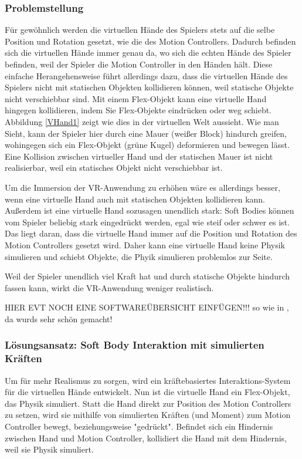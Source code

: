\subsubsection{Problemstellung}
Für gewöhnlich werden die virtuellen Hände des Spielers stets auf die selbe Position und Rotation gesetzt, wie die des Motion Controllers. Dadurch befinden sich die virtuellen Hände immer genau da, wo sich die echten Hände des Spieler befinden, weil der Spieler die Motion Controller in den Händen hält.
Diese einfache Herangehensweise führt allerdings dazu, dass die virtuellen Hände des Spielers nicht mit statischen Objekten kollidieren können, weil statische Objekte nicht verschiebbar sind. Mit einem Flex-Objekt kann eine virtuelle Hand hingegen kollidieren, indem Sie Flex-Objekte eindrücken oder weg schiebt. Abbildung \ref{VHand1} zeigt wie dies in der virtuellen Welt aussieht. Wie man Sieht, kann der Spieler hier durch eine Mauer (weißer Block) hindurch greifen, wohingegen sich ein Flex-Objekt (grüne Kugel) deformieren und bewegen lässt. Eine Kollision zwischen virtueller Hand und der statischen Mauer ist nicht realisierbar, weil ein statisches Objekt nicht verschiebbar ist.


Um die Immersion der VR-Anwendung zu erhöhen wäre es allerdings besser, wenn eine virtuelle Hand auch mit statischen Objekten kollidieren kann. Außerdem ist eine virtuelle Hand sozusagen unendlich stark: Soft Bodies können vom Spieler beliebig stark eingedrückt werden, egal wie steif oder schwer es ist. Das liegt daran, dass die virtuelle Hand immer auf die Position und Rotation des Motion Controllers gesetzt wird. Daher kann eine virtuelle Hand keine Physik simulieren und schiebt Objekte, die Phyik simulieren problemlos zur Seite.

Weil der Spieler unendlich viel Kraft hat und durch statische Objekte hindurch fassen kann, wirkt die VR-Anwendung weniger realistisch.

HIER EVT NOCH EINE SOFTWAREÜBERSICHT EINFÜGEN!!! so wie in \cite{VRSim20}, da wurds sehr schön gemacht!

\subsubsection{Lösungsansatz: Soft Body Interaktion mit simulierten Kräften}
Um für mehr Realismus zu sorgen, wird ein kräftebasiertes Interaktions-System für die virtuellen Hände entwickelt. Nun ist die virtuelle Hand ein Flex-Objekt, das Physik simuliert. Statt die Hand direkt zur Position des Motion Controllers zu setzen, wird sie mithilfe von simulierten Kräften (und Moment) zum Motion Controller bewegt, beziehungsweise "gedrückt". Befindet sich ein Hindernis zwischen Hand und Motion Controller, kollidiert die Hand mit dem Hindernis, weil sie Physik simuliert. 

